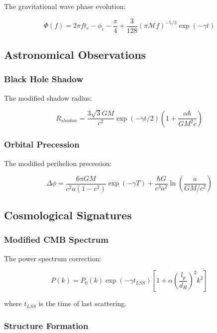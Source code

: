 \documentclass[12pt]{article}
\theoremstyle{plain}
\theoremstyle{definition}
\theoremstyle{remark}
\begin{document}
The gravitational wave phase evolution:

\begin{equation}
\Phi(f) = 2\pi f t_c - \phi_c - \frac{\pi}{4} + \frac{3}{128}(\pi \mathcal{M}f)^{-5/3}\exp(-\gamma t)
\end{equation}

\subsection{Astronomical Observations}

\subsubsection{Black Hole Shadow}

The modified shadow radius:

\begin{equation}
R_{shadow} = \frac{3\sqrt{3}GM}{c^2}\exp(-\gamma t/2)\left(1 + \frac{\alpha\hbar}{GM^2c}\right)
\end{equation}

\subsubsection{Orbital Precession}

The modified perihelion precession:

\begin{equation}
\Delta\phi = \frac{6\pi GM}{c^2a(1-e^2)}\exp(-\gamma T) + \frac{\hbar G}{c^3a^2}\ln\left(\frac{a}{GM/c^2}\right)
\end{equation}

\subsection{Cosmological Signatures}

\subsubsection{Modified CMB Spectrum}

The power spectrum correction:

\begin{equation}
P(k) = P_0(k)\exp(-\gamma t_{LSS})\left[1 + \alpha\left(\frac{l_p}{d_H}\right)^2k^2\right]
\end{equation}

where $t_{LSS}$ is the time of last scattering.

\subsubsection{Structure Formation}
\end{document}
